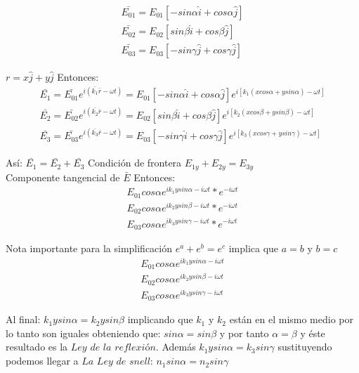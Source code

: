 \documentclass[]{article}
\begin{document}
\begin{eqnarray}
\bar{E_{01}}=E_{01}[-sin \alpha \hat{i} + cos \alpha \hat{j}]\\
\bar{E_{02}}=E_{02}[sin \beta \hat{i} + cos \beta \hat{j}]\\
\bar{E_{03}}=E_{03}[-sin \gamma \hat{j} + cos \gamma \hat{j}]
\end{eqnarray}

$r=x\hat{j}+y\hat{j}$ Entonces:\\

\begin{eqnarray}
\bar{E_1}=\bar{E_{01}}e^{i(\bar{k_1}\bar{r}-\omega t)}=E_{01}[-sin \alpha \hat{i} + cos \alpha \hat{j}] e^{i[k_1(x cos \alpha + y sin \alpha)-\omega t]}\\
\bar{E_2}=\bar{E_{02}}e^{i(\bar{k_2}\bar{r}-\omega t)}=E_{02}[sin \beta \hat{i} + cos \beta \hat{j}] e^{i[k_2(x cos \beta + y sin \beta)-\omega t]}\\
\bar{E_3}=\bar{E_{03}}e^{i(\bar{k_3}\bar{r}-\omega t)}=E_{03}[-sin \gamma \hat{i} + cos \gamma \hat{j}] e^{i[k_3(x cos \gamma + y sin \gamma)-\omega t]}
\end{eqnarray}

Así: $\bar{E_1}=\bar{E_2}+\bar{E_3}$ Condición de frontera $E_{1y}+E_{2y}=E_{3y}$\\

Componente tangencial de $\bar{E}$ Entonces:\\

\begin{eqnarray}
E_{01}cos \alpha e^{ik_1y sin \alpha-i \omega t}*e^{-i \omega t}\\
E_{02}cos \alpha e^{ik_2y sin \beta-i \omega t}*e^{-i \omega t}\\
E_{03}cos \alpha e^{ik_3y sin \gamma-i \omega t}*e^{-i \omega t}
\end{eqnarray}

Nota importante para la simplificación $e^a+e^b=e^c$ implica que $a=b$ y $b=c$\\

\begin{eqnarray}
E_{01}cos \alpha e^{ik_1y sin \alpha-i \omega t}\\
E_{02}cos \alpha e^{ik_2y sin \beta-i \omega t}\\
E_{03}cos \alpha e^{ik_3y sin \gamma-i \omega t}
\end{eqnarray}

Al final: $k_1ysin \alpha=k_2y sin \beta$ implicando que $k_1$ y $k_2$ están en el mismo medio por lo tanto son iguales obteniendo que: $sin \alpha=sin \beta$ y por tanto $\alpha=\beta$ y éste resultado es la $Ley$ $de$ $la$ $reflexión$. Además $k_1ysin\alpha=k_3sin \gamma$ sustituyendo podemos llegar a $La$ $Ley$ $de$ $snell$: $n_1 sin \alpha=n_2 sin \gamma$\\
\end{document}
